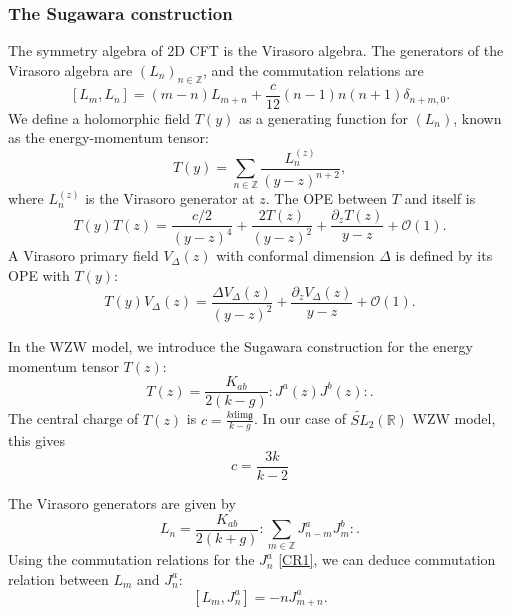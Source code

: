 \documentclass[10pt,a4paper]{article}
\numberwithin{equation}{section}
\begin{document}
\subsubsection*{The Sugawara construction}
The symmetry algebra of 2D CFT is the Virasoro algebra. The generators of the Virasoro algebra are $\left(L_{n}\right)_{n \in \mathbb{Z}}$, and 
the commutation relations are 
\begin{equation}
    \boxed{
        \left[L_{m},L_{n}\right] = (m-n)L_{m+n} + \frac{c}{12} (n-1)n(n+1) \delta_{n+m,0}.
    }
\end{equation}
We define a holomorphic field $T(y)$ as a generating function for $\left(L_{n}\right)$, known as the energy-momentum tensor:
\begin{equation}
    T(y) = \sum_{n\in \mathbb{Z}} \frac{L_{n}^{(z)}}{(y-z)^{n+2}},
\end{equation}
where $L_{n}^{(z)}$ is the Virasoro generator at $z$. The OPE between $T$ and itself is 
\begin{equation}
    T(y) T(z) = \frac{c/2}{(y-z)^{4}} + \frac{2 T(z)}{(y-z)^{2}} + \frac{\partial_{z} T(z)}{y-z} + \mathcal{O}(1).
\end{equation}
A Virasoro primary field $V_{\Delta}(z)$ with conformal dimension $\Delta$ is defined by its OPE with $T(y)$: 
\begin{equation}
    T(y) V_{\Delta}(z) = \frac{\Delta V_{\Delta}(z)}{(y-z)^{2}} + \frac{\partial_{z} V_{\Delta}(z)}{y-z} + \mathcal{O}(1).
\end{equation}

In the WZW model, we introduce the Sugawara construction for the energy momentum tensor $T(z)$: 
\begin{equation}
    \boxed{
        T(z) = \frac{K_{ab}}{2(k-g)} : J^{a}(z) J^{b}(z) : . \label{EM}
        } 
\end{equation}
The central charge of $T(z)$ is $c = \frac{k \mathrm{dim} \mathfrak{g}}{k-g}$. In our case of $\widetilde{SL}_{2}(\mathbb{R})$ 
WZW model, this gives 
\begin{equation}
    \boxed{
        c = \frac{3k}{k-2}
        }
\end{equation}

The Virasoro generators are given by
\begin{equation}
    L_{n} = \frac{K_{ab}}{2(k+g)} : \sum_{m \in \mathbb{Z} } J^{a}_{n-m} J^{b}_{m} :. \label{DefLn}
\end{equation}
Using the commutation relations for the $J^{a}_{n}$ \eqref{CR1}, we can deduce commutation relation between $L_{m}$ and $J^{a}_{n}$:
\begin{equation}
    \boxed{
            \left[ L_{m}, J^{a}_{n} \right] = -n J^{a}_{m+n}. \label{CR2}
    }
\end{equation}
\end{document}
